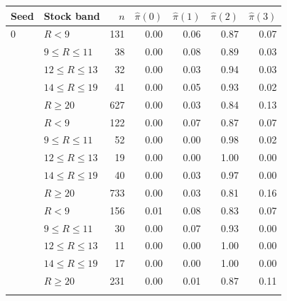 \begin{tabular}{llrrrrr}
\toprule
Seed & Stock band & $n$ & $\hat\pi(0)$ & $\hat\pi(1)$ & $\hat\pi(2)$ & $\hat\pi(3)$ \\
\midrule
0 & $R<9$ & 131 & 0.00 & 0.06 & 0.87 & 0.07 \\
 & $9\le R\le 11$ & 38 & 0.00 & 0.08 & 0.89 & 0.03 \\
 & $12\le R\le 13$ & 32 & 0.00 & 0.03 & 0.94 & 0.03 \\
 & $14\le R\le 19$ & 41 & 0.00 & 0.05 & 0.93 & 0.02 \\
 & $R\ge 20$ & 627 & 0.00 & 0.03 & 0.84 & 0.13 \\
\addlinespace
1 & $R<9$ & 122 & 0.00 & 0.07 & 0.87 & 0.07 \\
 & $9\le R\le 11$ & 52 & 0.00 & 0.00 & 0.98 & 0.02 \\
 & $12\le R\le 13$ & 19 & 0.00 & 0.00 & 1.00 & 0.00 \\
 & $14\le R\le 19$ & 40 & 0.00 & 0.03 & 0.97 & 0.00 \\
 & $R\ge 20$ & 733 & 0.00 & 0.03 & 0.81 & 0.16 \\
\addlinespace
2 & $R<9$ & 156 & 0.01 & 0.08 & 0.83 & 0.07 \\
 & $9\le R\le 11$ & 30 & 0.00 & 0.07 & 0.93 & 0.00 \\
 & $12\le R\le 13$ & 11 & 0.00 & 0.00 & 1.00 & 0.00 \\
 & $14\le R\le 19$ & 17 & 0.00 & 0.00 & 1.00 & 0.00 \\
 & $R\ge 20$ & 231 & 0.00 & 0.01 & 0.87 & 0.11 \\
\addlinespace
\bottomrule
\end{tabular}
